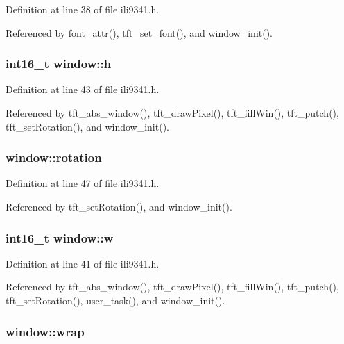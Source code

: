 Definition at line 38 of file ili9341.\-h.



Referenced by font\-\_\-attr(), tft\-\_\-set\-\_\-font(), and window\-\_\-init().

\hypertarget{structwindow_a822391abd5d09e6ce7152f68cff3ef2b}{
\subsubsection[{h}]{\setlength{\rightskip}{0pt plus 5cm}int16\-\_\-t window\-::h}}\label{structwindow_a822391abd5d09e6ce7152f68cff3ef2b}


Definition at line 43 of file ili9341.\-h.



Referenced by tft\-\_\-abs\-\_\-window(), tft\-\_\-draw\-Pixel(), tft\-\_\-fill\-Win(), tft\-\_\-putch(), tft\-\_\-set\-Rotation(), and window\-\_\-init().

\hypertarget{structwindow_afbd48ebcb41e68d0f458dac593578aa8}{
\subsubsection[{rotation}]{ window\-::rotation}}\label{structwindow_afbd48ebcb41e68d0f458dac593578aa8}


Definition at line 47 of file ili9341.\-h.



Referenced by tft\-\_\-set\-Rotation(), and window\-\_\-init().

\hypertarget{structwindow_ad89fdeb11ce94e2e7501f7290372d6ae}{
\subsubsection[{w}]{\setlength{\rightskip}{0pt plus 5cm}int16\-\_\-t window\-::w}}\label{structwindow_ad89fdeb11ce94e2e7501f7290372d6ae}


Definition at line 41 of file ili9341.\-h.



Referenced by tft\-\_\-abs\-\_\-window(), tft\-\_\-draw\-Pixel(), tft\-\_\-fill\-Win(), tft\-\_\-putch(), tft\-\_\-set\-Rotation(), user\-\_\-task(), and window\-\_\-init().

\hypertarget{structwindow_aee853dc29d3cf708890faff063ce9afb}{
\subsubsection[{wrap}]{ window\-::wrap}}\label{structwindow_aee853dc29d3cf708890faff063ce9afb}


